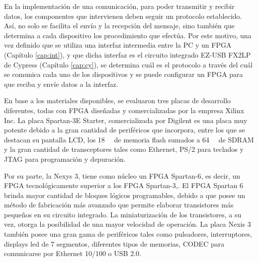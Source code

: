 
En la implementación de una comunicación, para poder transmitir y recibir datos, los componentes que intervienen deben seguir un protocolo establecido. Así, no solo se facilita el envío y la recepción del mensaje, sino también que determina a cada dispositivo los procedimiento que efectúa. Por este motivo, una vez definido que se utiliza una interfaz intermedia entre la PC y un FPGA (Capítulo \ref{cap:int}), y que dicha interfaz es el circuito integrado EZ-USB FX2LP de Cypress (Capítulo \ref{cap:cy}), se determina cuál es el protocolo a través del cuál se comunica cada uno de los dispositivos y se puede configurar un FPGA para que reciba y envíe datos a la interfaz.

En base a los materiales disponibles, se evaluaron tres placas de desarrollo diferentes, todas con FPGA diseñadas y comercializadas por la empresa Xilinx Inc. La placa Spartan-3E Starter, comercializada por Digilent es una placa muy potente debido a la gran cantidad de periféricos que incorpora, entre los que se destacan su pantalla LCD, los \SI{18}{\mega\byte} de memoria flash sumados a \SI{64}{\mega\byte} de SDRAM y la gran cantidad de transceptores tales como Ethernet, PS/2 para teclados y JTAG para programación y depuración.

Por su parte, la Nexys 3, tiene como núcleo un FPGA Spartan-6, es decir, un FPGA tecnológicamente superior a los FPGA Spartan-3,. El FPGA Spartan 6 brinda mayor cantidad de bloques lógicos programables, debido a que posee un método de fabricación más avanzado que permite elaborar transistores más pequeños en su circuito integrado. La miniaturización de los transistores, a su vez, otorga la posibilidad de una mayor velocidad de operación. La placa Nexis 3 también posee una gran gama de periféricos tales como pulsadores, interruptores, displays led de 7 segmentos, diferentes tipos de memorias, CODEC para comunicarse por Ethernet 10/100 o USB 2.0.

